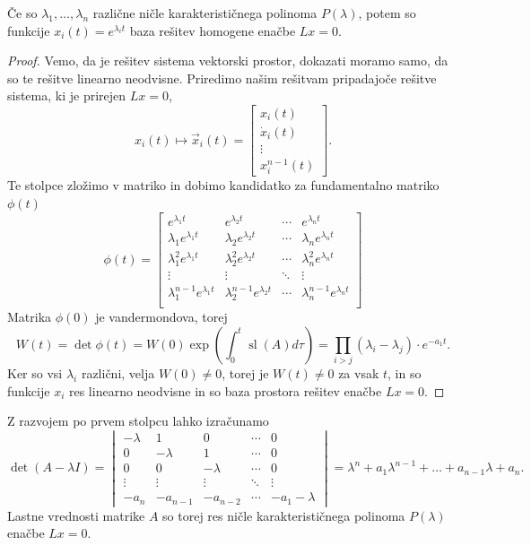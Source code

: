 \begin{trditev}
  Če so $\lambda_1, \ldots, \lambda_n$ različne ničle karakterističnega polinoma
  $P(\lambda)$, potem so funkcije $x_i(t) = e^{\lambda_i t}$ baza rešitev
  homogene enačbe $Lx = 0$.
\end{trditev}

\begin{proof}
  Vemo, da je rešitev sistema vektorski prostor, dokazati moramo samo, da so te
  rešitve linearno neodvisne.
  Priredimo našim rešitvam pripadajoče rešitve sistema, ki je prirejen $Lx = 0$,
  \[
	x_i(t) \mapsto \vec{x}_i(t) =
	\begin{bmatrix}
	  x_i(t) \\ \dot{x}_i(t) \\ \vdots \\ x_i^{n-1}(t)
	\end{bmatrix}.
  \]
  Te stolpce zložimo v matriko in dobimo kandidatko za fundamentalno matriko
  $\phi(t)$
  \[
	\phi(t)
	=
	\begin{bmatrix}
	  e^{\lambda_1 t} & e^{\lambda_2 t} & \cdots & e^{\lambda_n t} \\
	  \lambda_1 e^{\lambda_1 t} & \lambda_2 e^{\lambda_2 t} & \cdots & \lambda_n
																	   e^{\lambda_n t} \\
	  \lambda_1^2 e^{\lambda_1 t} & \lambda_2^2 e^{\lambda_2 t} & \cdots & \lambda_n^2
																	   e^{\lambda_n t} \\
	  \vdots & \vdots & \ddots & \vdots \\
	  \lambda_1^{n-1} e^{\lambda_1 t} & \lambda_2^{n-1} e^{\lambda_2 t} & \cdots
												 & \lambda_n^{n-1} e^{\lambda_n t} \\
	\end{bmatrix}
  \]
  Matrika $\phi(0)$ je vandermondova, torej
  \[
	W(t) = \det \phi(t) = W(0) \exp\left( \int_0^t \operatorname{sl}(A) d\tau
	\right)
	= \prod_{i>j} (\lambda_i - \lambda_j) \cdot e^{- a_1 t}.
  \]
  Ker so vsi $\lambda_i$ različni, velja $W(0) \ne 0$, torej je $W(t) \ne 0$
  za vsak $t$, in so funkcije $x_i$ res linearno neodvisne in so baza prostora
  rešitev enačbe $Lx = 0$.
\end{proof}


Z razvojem po prvem stolpcu lahko izračunamo
\[
  \det (A - \lambda I)
  =
  \begin{vmatrix}
	-\lambda & 1 & 0 & \cdots & 0 \\
	0 & -\lambda & 1 & \cdots & 0 \\
	0 & 0 & -\lambda & \cdots & 0 \\
	\vdots & \vdots & \vdots & \ddots & \vdots \\
	-a_n & -a_{n-1} & -a_{n-2} & \cdots & -a_1-\lambda
  \end{vmatrix}
  = \lambda^n + a_1 \lambda^{n-1} + \ldots + a_{n-1} \lambda + a_n.
\]
Lastne vrednosti matrike $A$ so torej res ničle karakterističnega polinoma
$P(\lambda)$ enačbe $Lx = 0$.

